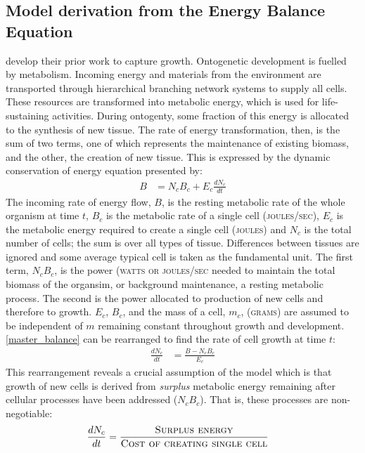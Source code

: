 \documentclass[a4paper]{article} %
\begin{document}
\subsection{Model derivation from the Energy Balance Equation}
\cite{West2001} develop their prior work \autocite{West1997} to capture growth. Ontogenetic development is fuelled by metabolism. Incoming energy and materials from the environment are transported through hierarchical branching network systems to supply all cells. These resources are transformed into metabolic energy, which is used for life-sustaining activities. During ontogenty, some fraction of this energy is allocated to the synthesis of new tissue. The rate of energy transformation, then, is the sum of two terms, one of which represents the maintenance of existing biomass, and the other, the creation of new tissue. This is expressed by the dynamic conservation of energy equation presented by:
\begin{align}
    B &= N_{c}B_{c} + E_{c}\frac{dN_{c}}{dt} \label{master_balance}
\end{align}
The incoming rate of energy flow, $B$, is the resting metabolic rate of the whole organism at time $t$, $B_c$ is the metabolic rate of a single cell (\textsc{joules/sec}), $E_c$ is the metabolic energy required to create a single cell (\textsc{joules}) and $N_c$ is the total number of cells; the sum is over all types of tissue. Differences between tissues are ignored and some average typical cell is taken as the fundamental unit. The first term, $N_{c}B_{c}$, is the power (\textsc{watts or joules/sec} needed to maintain the total biomass of the organsim, or background maintenance, a resting metabolic process. The second is the power allocated to production of new cells and therefore to growth. $E_c$, $B_c$, and the mass of a cell, $m_c$, (\textsc{grams}) are assumed to be independent of $m$ remaining constant throughout growth and development. \eqref{master_balance} can be rearranged to find the rate of cell growth at time $t$: 
\begin{align}
    \frac{dN_{c}}{dt} &= \frac{B - N_{c}B_{c}}{E_{c}} \label{cell_rate}
\end{align}
This rearrangement reveals a crucial assumption of the model which is that growth of new cells is derived from \textit{surplus} metabolic energy remaining after cellular processes have been addressed ($N_{c}B_{c}$). That is, these processes are non-negotiable:
\begin{align*}    
    \frac{dN_{c}}{dt} &= \frac{\textsc{Surplus energy}}{\textsc{Cost of creating single cell}}
\end{align*}
\end{document}
